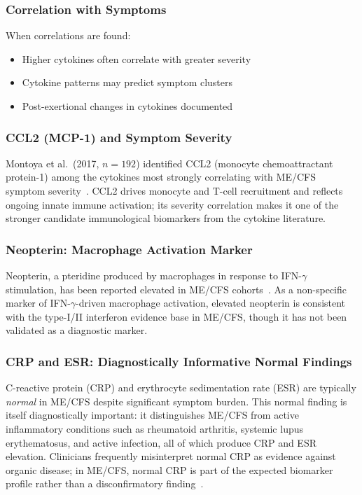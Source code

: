\subsubsection{Correlation with Symptoms}
When correlations are found:
\begin{itemize}
    \item Higher cytokines often correlate with greater severity
    \item Cytokine patterns may predict symptom clusters
    \item Post-exertional changes in cytokines documented
\end{itemize}

\subsubsection{CCL2 (MCP-1) and Symptom Severity}

Montoya et al.\ (2017, $n = 192$) identified CCL2 (monocyte chemoattractant protein-1) among the cytokines most strongly correlating with ME/CFS symptom severity~\cite{Montoya2017}. CCL2 drives monocyte and T-cell recruitment and reflects ongoing innate immune activation; its severity correlation makes it one of the stronger candidate immunological biomarkers from the cytokine literature.

\subsubsection{Neopterin: Macrophage Activation Marker}

Neopterin, a pteridine produced by macrophages in response to IFN-$\gamma$ stimulation, has been reported elevated in ME/CFS cohorts~\cite{Maksoud2023}. As a non-specific marker of IFN-$\gamma$-driven macrophage activation, elevated neopterin is consistent with the type-I/II interferon evidence base in ME/CFS, though it has not been validated as a diagnostic marker.

\subsubsection{CRP and ESR: Diagnostically Informative Normal Findings}

C-reactive protein (CRP) and erythrocyte sedimentation rate (ESR) are typically \emph{normal} in ME/CFS despite significant symptom burden. This normal finding is itself diagnostically important: it distinguishes ME/CFS from active inflammatory conditions such as rheumatoid arthritis, systemic lupus erythematosus, and active infection, all of which produce CRP and ESR elevation. Clinicians frequently misinterpret normal CRP as evidence against organic disease; in ME/CFS, normal CRP is part of the expected biomarker profile rather than a disconfirmatory finding~\cite{Maksoud2023}.

